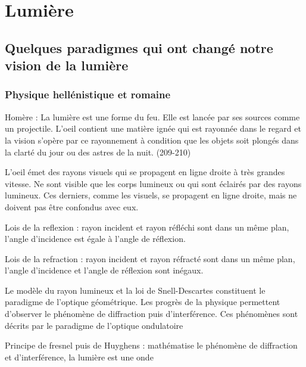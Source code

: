 \chapter{Lumière}

\section{Quelques paradigmes qui ont changé notre vision de la lumière}

\subsection{Physique hellénistique et romaine}

Homère : La lumière est une forme du feu. Elle est lancée par ses sources comme un projectile. L'oeil contient une matière ignée qui est rayonnée dans le regard et la vision s'opère par ce rayonnement à condition que les objets soit plongés dans la clarté du jour ou des astres de la nuit. (209-210)

L'oeil émet des rayons visuels qui se propagent en ligne droite à très grandes vitesse. Ne sont visible que les corps lumineux ou qui sont éclairés par des rayons lumineux. Ces derniers, comme les visuels, se propagent en ligne droite, mais ne doivent pas être confondus avec eux.

Lois de la reflexion : rayon incident et rayon réfléchi sont dans un même plan, l'angle d'incidence est égale à l'angle de réflexion.

Lois de la refraction : rayon incident et rayon réfracté sont dans un même plan, l'angle d'incidence et l'angle de réflexion sont inégaux. 


\begin{center}
\end{center}

\begin{center}
\end{center}

Le modèle du rayon lumineux et la loi de Snell-Descartes constituent le paradigme de l'optique géométrique. Les progrès de la physique permettent d'observer le phénomène de diffraction puis d'interférence. Ces phénomènes sont décrits par le paradigme de l'optique ondulatoire

\begin{center}
Principe de fresnel puis de Huyghens : mathématise le phénomène de diffraction et d'interférence, la lumière est une onde
\end{center}





\subsection{}\subsection{}
\begin{center}
\end{center}

